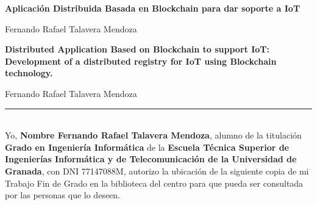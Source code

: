 \myemptypage


\myemptypage
\thispagestyle{empty}

\begin{center}
{\large\bfseries Aplicación Distribuida Basada en Blockchain para dar soporte a IoT}\\
\end{center}
\begin{center}
Fernando Rafael Talavera Mendoza\\
\end{center}


\vspace{0.7cm}

\newpage
\thispagestyle{empty}

\begin{center}
{\large\bfseries Distributed Application Based on Blockchain to support IoT: Development of a distributed registry for 
IoT using Blockchain technology.}\\
\end{center}
\begin{center}
Fernando Rafael Talavera Mendoza\\
\end{center}


\vspace{0.7cm}

\clearpage
\thispagestyle{empty}

\noindent\rule[-1ex]{\textwidth}{2pt}\\[4.5ex]

Yo, \textbf{Nombre Fernando Rafael Talavera Mendoza}, alumno de la titulación \textbf{Grado en Ingeniería Informática} 
de la \textbf{Escuela Técnica Superior de Ingenierías Informática y de Telecomunicación de la Universidad de Granada}, 
con DNI 77147088M, autorizo la ubicación de la siguiente copia de mi Trabajo Fin de Grado en la biblioteca del centro 
para que pueda ser consultada por las personas que lo deseen.

\vspace{6cm}

